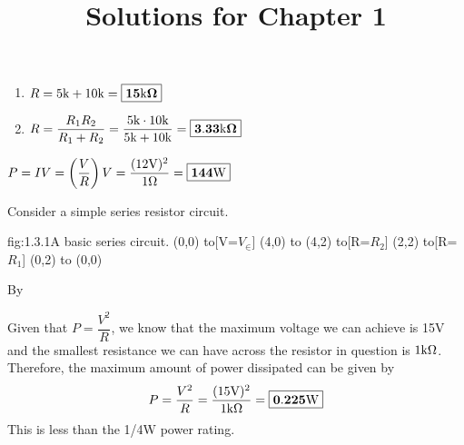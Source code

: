 \documentclass{article}
\begin{document}
\title{Solutions for Chapter 1}
    \begin{enumerate}
        \item 
        $R = 5\text{k} + 10\text{k} = \boxed{\mathbf{15\text{k}\Omega}}$

        \item 
        $R = \dfrac{R_1 R_2}{R_1 + R_2} = \dfrac{5\text{k} \cdot 10\text{k}}{5\text{k} + 10\text{k}} = \boxed{\mathbf{3.33\text{k}\Omega}}$

    \end{enumerate}

    $P = IV = \left(\dfrac{V}{R}\right)V = \dfrac{(12\text{V})^2}{1\Omega} = \boxed{\mathbf{144\text{W}}}$

    Consider a simple series resistor circuit.
    \begin{circuit}{fig:1.3.1}{A basic series circuit.}
        (0,0) to[V=$V_\in$] (4,0)
            to (4,2)
            to[R=$R_2$] (2,2)
            to[R=$R_1$] (0,2)
            to (0,0)
    \end{circuit}
    By 


    Given that $P = \dfrac{V^2}{R}$, we know that the maximum voltage we can achieve is 15V and the smallest resistance we can have across the resistor in question is $1\text{k}\Omega$. Therefore, the maximum amount of power dissipated can be given by \[P = \frac{V^2}{R} = \frac{(15\text{V})^2}{1\text{k}\Omega} = \boxed{\mathbf{0.225\text{W}}}\]
    This is less than the 1/4W power rating.
\end{document}
